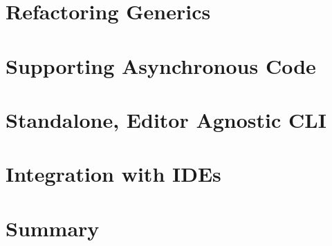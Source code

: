 \section{Refactoring Generics}
\label{sec:refactoring_generics}

\section{Supporting Asynchronous Code}
\label{sec:supporting_asynchronous_code}

\section{Standalone, Editor Agnostic CLI}
\label{sec:standalone_cli}

\section{Integration with IDEs}
\label{sec:integration_ides}

\section{Summary}
\label{sec:summary_2}